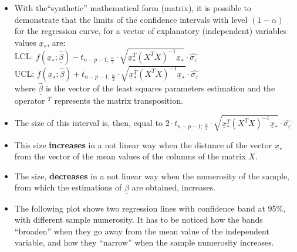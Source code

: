 \begin{frame}
  \vspace*{.25cm}
  \begin{itemize}
    \item With the``synthetic'' mathematical form (matrix), it is possible to demonstrate that the limits of the confidence intervals with level $(1-\alpha)$ for the regression curve, for a vector of explanatory (independent) variables values $\underline{x}_*$, are: \\
      \vspace*{.1cm}
      LCL: $f(\underline{x}_*;\hat{\underline{\beta}})-t_{n-p-1;\,\frac{\alpha}{2}}\cdot \sqrt{\underline{x}_*^T(X^TX)^{-1}\underline{x}_*}\cdot \hat{\sigma_\varepsilon}$ \\
      \vspace*{.1cm}
      UCL: $f(\underline{x}_*;\hat{\underline{\beta}})+t_{n-p-1;\,\frac{\alpha}{2}}\cdot \sqrt{\underline{x}_*^T(X^TX)^{-1}\underline{x}_*}\cdot \hat{\sigma_\varepsilon}$ \\
      \vspace*{.1cm}
      where $\hat{\underline{\beta}}$ is the vector of the least squares parameters estimation and the operator $^T$ represents the matrix transposition.
    \vspace{0.5cm}
    \item The size of this interval is, then, equal to $2\cdot t_{n-p-1;\,\frac{\alpha}{2}}\cdot \sqrt{\underline{x}_*^T(X^TX)^{-1}\underline{x}_*}\cdot \hat{\sigma_\varepsilon}$
  \end{itemize}
\end{frame}

\begin{frame}
  \vspace*{.25cm}
  \begin{itemize}
    \item This size \textbf{increases} in a not linear way when the distance of the vector $\underline{x}_*$ from the vector of the mean values of the columns of the matrix $X$.
    \vspace*{.25cm}
    \item The size, \textbf{decreases} in a not linear way when the numerosity of the sample, from which the estimations of $\underline{\beta}$ are obtained, increases.
    \vspace*{.25cm}
    \item The following plot shows two regression lines with confidence band at 95\%, with different sample numerosity. It has to be noticed how the bands ``broaden'' when they go away from the mean value of the independent variable, and how they ``narrow'' when the sample numerosity increases.
  \end{itemize}
\end{frame}

